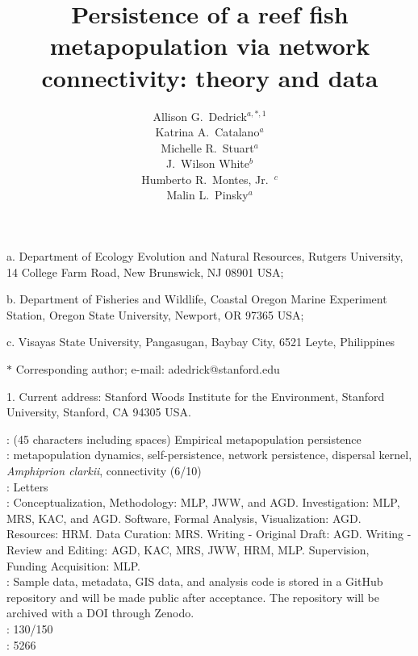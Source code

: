 \documentclass[12pt, oneside]{article}   	%
\author{}
\author{Allison G.\ Dedrick$^{a, \ast, 1}$ \\
Katrina A.\ Catalano$^a$ \\
Michelle R.\ Stuart$^a$ \\
J.\ Wilson White$^b$ \\
Humberto R.\ Montes, Jr.\ $^c$ \\
Malin L.\ Pinsky$^a$}
\title{Persistence of a reef fish metapopulation via network connectivity: theory and data}
\date{}
\begin{document}
\renewcommand{\topfraction}{0.95}
\maketitle{}

\noindent{} a. Department of Ecology Evolution and Natural Resources, Rutgers University, 14 College Farm Road, New Brunswick, NJ 08901 USA;

\noindent{} b. Department of Fisheries and Wildlife, Coastal Oregon Marine Experiment Station, Oregon State University, Newport, OR 97365 USA;

\noindent{} c. Visayas State University, Pangasugan, Baybay City, 6521 Leyte, Philippines

\noindent{} $\ast$ Corresponding author; e-mail: adedrick@stanford.edu

\noindent{} 1. Current address: Stanford Woods Institute for the Environment, Stanford University, Stanford, CA 94305 USA.

: (45 characters including spaces) Empirical metapopulation persistence \\

: metapopulation dynamics, self-persistence, network persistence, dispersal kernel, \textit{Amphiprion clarkii}, connectivity (6/10) \\ 

: Letters \\ 

: Conceptualization, Methodology: MLP, JWW, and AGD. Investigation: MLP, MRS, KAC, and AGD. Software, Formal Analysis, Visualization: AGD. Resources: HRM. Data Curation: MRS. Writing - Original Draft: AGD. Writing - Review and Editing: AGD, KAC, MRS, JWW, HRM, MLP. Supervision, Funding Acquisition: MLP.  \\

: Sample data, metadata, GIS data, and analysis code is stored in a GitHub repository and will be made public after acceptance. The repository will be archived with a DOI through Zenodo. \\

: 130/150\\ 

: 5266 \\ 
\end{document}

